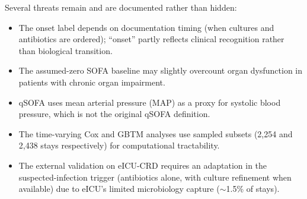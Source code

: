 Several threats remain and are documented rather than hidden:
\begin{itemize}
  \item The onset label depends on documentation timing (when cultures and
  antibiotics are ordered); ``onset'' partly reflects clinical recognition
  rather than biological transition.
  \item The assumed-zero SOFA baseline may slightly overcount organ dysfunction
  in patients with chronic organ impairment.
  \item qSOFA uses mean arterial pressure (MAP) as a proxy for systolic blood
  pressure, which is not the original qSOFA definition.
  \item The time-varying Cox and GBTM analyses use sampled subsets (2{,}254 and
  2{,}438 stays respectively) for computational tractability.
  \item The external validation on eICU-CRD requires an adaptation in the
  suspected-infection trigger (antibiotics alone, with culture refinement when
  available) due to eICU's limited microbiology capture ($\sim$1.5\% of stays).
\end{itemize}
